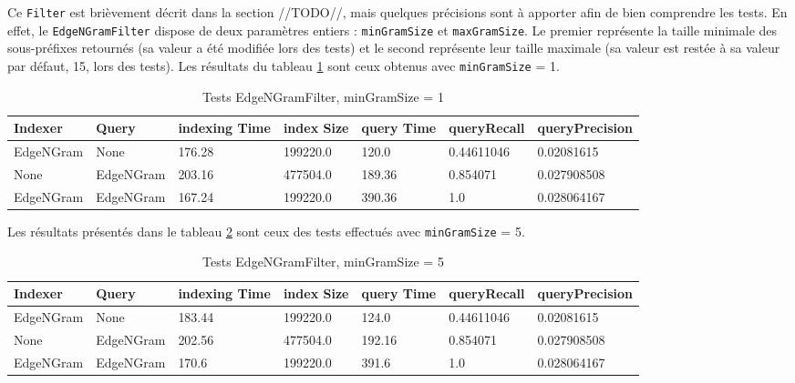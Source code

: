 Ce \texttt{Filter} est brièvement décrit dans la section //TODO//, mais quelques précisions sont à apporter afin de bien comprendre les tests. En effet, le \texttt{EdgeNGramFilter} dispose de deux paramètres entiers : \texttt{minGramSize} et \texttt{maxGramSize}. Le premier représente la taille minimale des sous-préfixes retournés (sa valeur a été modifiée lors des tests) et le second représente leur taille maximale (sa valeur est restée à sa valeur par défaut, 15, lors des tests). Les résultats du tableau \ref{tab:tests_EdgeNGramFilter1} sont ceux obtenus avec \texttt{minGramSize} = 1.

\begin{table}[!htbp]
    \hspace{-2cm}
                \begin{tabular}{|p{2cm}|p{2cm}|p{2cm}|p{2cm}|p{2.5cm}|p{2.5cm}|p{2.5cm}|}
                    \hline
                    \textbf{Indexer} & \textbf{Query} & \textbf{indexing Time} & \textbf{index Size} & \textbf{query Time} & \textbf{queryRecall} & \textbf{queryPrecision}\\
                    \hline
EdgeNGram & None & 176.28 & 199220.0 & 120.0 & 0.44611046 & 0.02081615\\
		\hline
None & EdgeNGram & 203.16 & 477504.0 & 189.36 & 0.854071 & 0.027908508\\
		\hline
EdgeNGram & EdgeNGram & 167.24 & 199220.0 & 390.36 & 1.0 & 0.028064167\\
                    \hline
                \end{tabular}
                \caption{Tests EdgeNGramFilter, minGramSize = 1}
                \label{tab:tests_EdgeNGramFilter1}
            \end{table}

Les résultats présentés dans le tableau \ref{tab:tests_EdgeNGramFilter5} sont ceux des tests effectués avec \texttt{minGramSize} = 5.

\begin{table}[!htbp]
    \hspace{-2cm}
                \begin{tabular}{|p{2cm}|p{2cm}|p{2cm}|p{2cm}|p{2.5cm}|p{2.5cm}|p{2.5cm}|}
                    \hline
                    \textbf{Indexer} & \textbf{Query} & \textbf{indexing Time} & \textbf{index Size} & \textbf{query Time} & \textbf{queryRecall} & \textbf{queryPrecision}\\
                    \hline
EdgeNGram & None & 183.44 & 199220.0 & 124.0 & 0.44611046 & 0.02081615\\
		\hline
None & EdgeNGram & 202.56 & 477504.0 & 192.16 & 0.854071 & 0.027908508\\
		\hline
EdgeNGram & EdgeNGram & 170.6 & 199220.0 & 391.6 & 1.0 & 0.028064167\\
                    \hline
                \end{tabular}
                \caption{Tests EdgeNGramFilter, minGramSize = 5}
                \label{tab:tests_EdgeNGramFilter5}
            \end{table}

